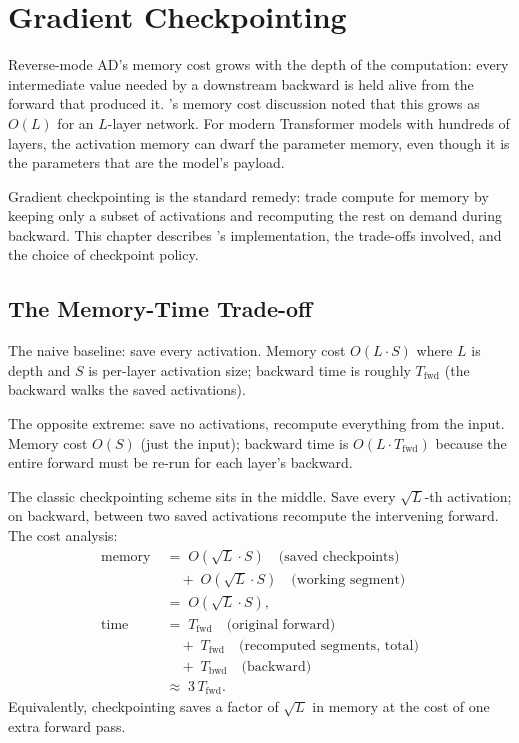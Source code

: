 \chapter{Gradient Checkpointing}
\label{ch:gradient_checkpointing}

Reverse-mode AD's memory cost grows with the depth of the
computation: every intermediate value needed by a downstream
backward is held alive from the forward that produced it.
's memory cost discussion noted that this
grows as $O(L)$ for an $L$-layer network. For modern Transformer
models with hundreds of layers, the activation memory can dwarf
the parameter memory, even though it is the parameters that are
the model's payload.

Gradient checkpointing is the standard remedy: trade compute for
memory by keeping only a subset of activations and recomputing
the rest on demand during backward. This chapter describes
\Lucid's implementation, the trade-offs involved, and the choice
of checkpoint policy.

\section{The Memory-Time Trade-off}
\label{sec:gradient_checkpointing:trade_off}

The naive baseline: save every activation. Memory cost
$O(L \cdot S)$ where $L$ is depth and $S$ is per-layer activation
size; backward time is roughly $T_{\text{fwd}}$ (the backward
walks the saved activations).

The opposite extreme: save no activations, recompute everything
from the input. Memory cost $O(S)$ (just the input); backward
time is $O(L \cdot T_{\text{fwd}})$ because the entire forward
must be re-run for each layer's backward.

The classic checkpointing scheme \cite{chen_training_2016} sits in
the middle. Save every $\sqrt{L}$-th activation; on backward, between
two saved activations recompute the intervening forward. The cost
analysis:
\begin{align*}
\text{memory}    &\;=\; O(\sqrt{L} \cdot S) \quad \text{(saved checkpoints)} \\
                 &\quad\;+\; O(\sqrt{L} \cdot S) \quad \text{(working segment)} \\
                 &\;=\; O(\sqrt{L} \cdot S), \\[4pt]
\text{time}      &\;=\; T_{\text{fwd}} \quad \text{(original forward)} \\
                 &\quad\;+\; T_{\text{fwd}} \quad \text{(recomputed segments, total)} \\
                 &\quad\;+\; T_{\text{bwd}} \quad \text{(backward)} \\
                 &\;\approx\; 3\,T_{\text{fwd}}.
\end{align*}
Equivalently, checkpointing saves a factor of $\sqrt{L}$ in
memory at the cost of one extra forward pass.

